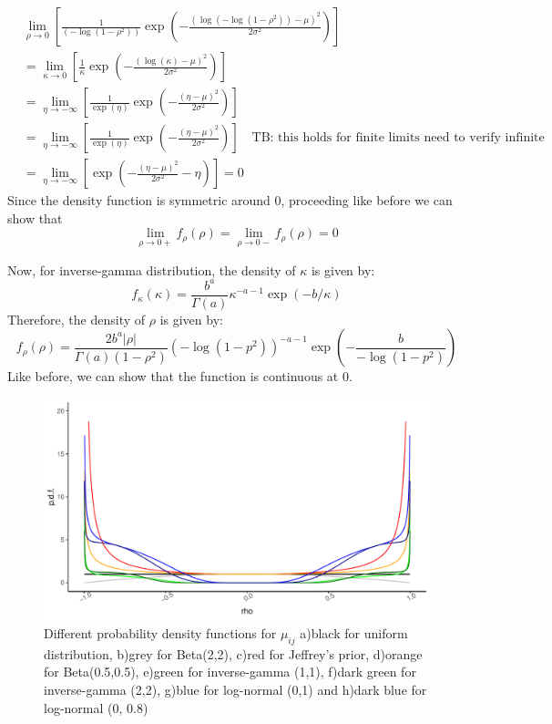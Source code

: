 \documentclass{amsart}
\begin{document}
\begin{align}
	&\lim_{\rho\to 0}\left[\frac{1}{(-\log(1-\rho^2))} 
	\exp\left(-\frac{(\log(-\log(1-\rho^2))-\mu)^2}{2\sigma^2}\right)\right]\\
	& = \lim_{\kappa\to 0}\left[\frac{1}{\kappa} 
	\exp\left(-\frac{(\log(\kappa)-\mu)^2}{2\sigma^2}\right)\right]\\
	& = \lim_{\eta\to -\infty}\left[\frac{1}{\exp(\eta)} 
	\exp\left(-\frac{(\eta-\mu)^2}{2\sigma^2}\right)\right]\\
	& = \lim_{\eta\to -\infty}\left[\frac{1}{\exp(\eta)} 
	\exp\left(-\frac{(\eta-\mu)^2}{2\sigma^2}\right)\right]\quad \text{TB: this holds for finite limits need to verify infinite}\\
	& = \lim_{\eta\to -\infty}\left[ 
	\exp\left(-\frac{(\eta-\mu)^2}{2\sigma^2}-\eta\right)\right] = 0
\end{align}
Since the density function is symmetric around 0, proceeding like before we can show that
\begin{equation}
	\lim_{\rho\to 0+}f_{\rho}(\rho) = \lim_{\rho\to 0-}f_{\rho}(\rho) = 0
\end{equation}

Now, for inverse-gamma distribution, the density of $\kappa$ is given by:
\begin{equation}
	f_{\kappa}(\kappa)= \frac{b^{a}}{\Gamma(a)}
	\kappa^{-a-1}\exp(-b/\kappa)
\end{equation}
Therefore, the density of $\rho$ is given by:
\begin{equation}
	f_{\rho}(\rho) = \frac{2b^{a}|\rho|}{\Gamma(a)(1-\rho^2)}
	(-\log(1-p^2))^{-a-1}\exp\left(-\frac{b}{-\log(1-p^2)}\right)
\end{equation}
Like before, we can show that the function is continuous at 0.

\begin{figure}[ht]
	\centering
	\includegraphics[width=0.85\linewidth]{prior_comparison.pdf}
	\caption{Different probability density functions for $\mu_{ij}$ a)black for uniform distribution,
	b)grey for Beta(2,2),
	c)red for Jeffrey's prior,
	d)orange for Beta(0.5,0.5),
	e)green for inverse-gamma (1,1),
	f)dark green for inverse-gamma (2,2),
	g)blue for log-normal (0,1) and
	h)dark blue for log-normal (0, 0.8)}
	\label{fig:sim-prior}
\end{figure}
\end{document}
